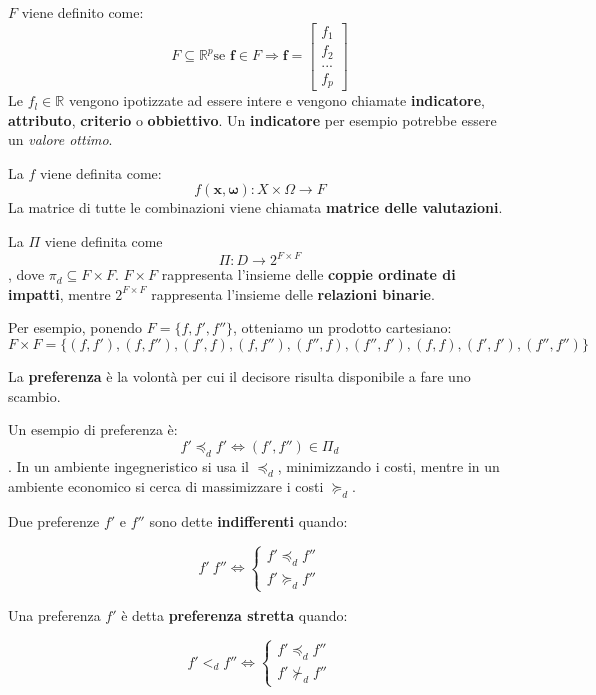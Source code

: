 \documentclass[\main/main.tex]{subfiles}
\begin{document}
$F$ viene definito come: \[F \subseteq \mathbb{R}^p \text{se } \bm{f} \in F \Rightarrow \bm{f} = \begin{bmatrix}f_1\\ f_2\\...\\ f_p \end{bmatrix}\]
Le $f_l \in \mathbb{R}$ vengono ipotizzate ad essere intere e vengono chiamate \textbf{indicatore}, \textbf{attributo}, \textbf{criterio} o \textbf{obbiettivo}. Un \textbf{indicatore} per esempio potrebbe essere un \textit{valore ottimo}.

La $f$ viene definita come: \[ f(\bm{x},\bm{\omega}): X\times\Omega \rightarrow F \]
La matrice di tutte le combinazioni viene chiamata \textbf{matrice delle valutazioni}.

La $\Pi$ viene definita come \[\Pi: D \rightarrow 2^{F\times F}\], dove $\pi_d \subseteq F\times F$. $F\times F$ rappresenta l'insieme delle \textbf{coppie ordinate di impatti}, mentre $2^{F \times F}$ rappresenta l'insieme delle \textbf{relazioni binarie}.

Per esempio, ponendo $F = \{f, f', f''\}$, otteniamo un prodotto cartesiano: \[F \times F = \{ (f,f'), (f,f''), (f', f), (f, f''), (f'', f), (f'', f'), (f, f), (f', f'), (f'', f'') \}\]

La \textbf{preferenza} è la volontà per cui il decisore risulta disponibile a fare uno scambio.

Un esempio di preferenza è: \[ f' \preccurlyeq_d f' \Leftrightarrow (f', f'')\in \Pi_d \]. In un ambiente ingegneristico si usa il $\preccurlyeq_d$, minimizzando i costi, mentre in un ambiente economico si cerca di massimizzare i costi $\succcurlyeq_d$.

\begin{definition}[indifferenza]
Due preferenze $f'$ e $f''$ sono dette \textbf{indifferenti} quando:

\[
	f' ~ f'' \Leftrightarrow \begin{cases} f' \preccurlyeq_d f'' \\ f' \succcurlyeq_d f'' \end{cases}
\] 
\end{definition}

\begin{definition}
Una preferenza $f'$ è detta \textbf{preferenza stretta} quando:

\[
	f' <_d f'' \Leftrightarrow
	\begin{cases}
		f' \preccurlyeq_d f'' \\
		f' \nsucc_d f''
	\end{cases}
\] 
\end{definition}
\end{document}
